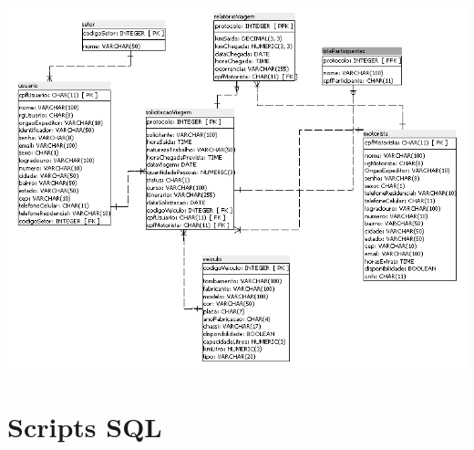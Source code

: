 \documentclass[11pt]{article}
\begin{document}
\begin{center}
\includegraphics[scale=0.85]{diagramaDeDados.png}
\end{center}

\section{Scripts SQL}
\end{document}
